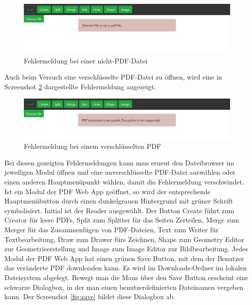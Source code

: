 \begin{figure}[!htbp]
	\centering
	\includegraphics[width=1\textwidth]{"images/errorfile.png"}
	\caption{Fehlermeldung bei einer nicht-PDF-Datei}
	\label{fig:errorfile}
\end{figure}

Auch beim Versuch eine verschlüsselte PDF-Datei zu öffnen, wird eine in Screenshot \ref{fig:errorcrypt} dargestellte Fehlermeldung angezeigt.

\begin{figure}[!htbp]
	\centering
	\includegraphics[width=1\textwidth]{"images/errorcrypt.png"}
	\caption{Fehlermeldung bei einem verschlüsselten PDF}
	\label{fig:errorcrypt}
\end{figure}

Bei diesen gezeigten Fehlermeldungen kann man erneut den Dateibrowser im jeweiligen Modul öffnen und eine unverschlüsselte PDF-Datei auswählen oder einen anderen Hauptmenüpunkt wählen, damit die Fehlermeldung verschwindet. \\

Ist ein Modul der PDF Web App geöffnet, so wird der entsprechende Hauptmenübutton durch einen dunkelgrauen Hintergrund mit grüner Schrift symbolisiert. Initial ist der Reader ausgewählt. Der Button Create führt zum Creator für leere PDFs, Split zum Splitter für das Seiten Zerteilen, Merge zum Merger für das Zusammenfügen von PDF-Dateien, Text zum Writer für Textbearbeitung, Draw zum Drawer fürs Zeichnen, Shape zum Geometry Editor zur Geometrieerstellung und Image zum Image Editor zur Bildbearbeitung. Jedes Modul der PDF Web App hat einen grünen Save Button, mit dem der Benutzer das veränderte PDF downloaden kann. Es wird im Downloads-Ordner im lokalen Dateisystem abgelegt. Bewegt man die Maus über den Save Button erscheint eine schwarze Dialogbox, in der man einen benutzerdefinierten Dateinamen vergeben kann. Der Screenshot \ref{fig:save} bildet diese Dialogbox ab. 

